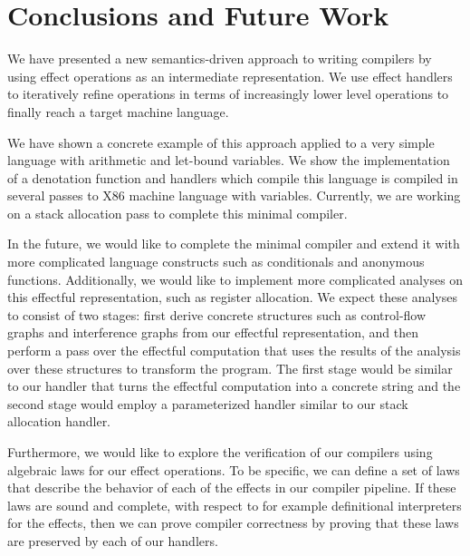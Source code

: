 \documentclass[a4paper,UKenglish,cleveref, autoref, thm-restate, anonymous]{oasics-v2021}
\begin{document}
\section{Conclusions and Future Work}\label{sec:conclusion}

We have presented a new semantics-driven approach to writing compilers by using effect operations as an intermediate representation.
We use effect handlers to iteratively refine operations in terms of increasingly lower level operations to finally reach a target machine language.

We have shown a concrete example of this approach applied to a very simple language with arithmetic and let-bound variables.
We show the implementation of a denotation function and handlers which compile this language is compiled in several passes to X86 machine language with variables.
Currently, we are working on a stack allocation pass to complete this minimal compiler.

In the future, we would like to complete the minimal compiler and extend it with more complicated language constructs such as conditionals and anonymous functions.
Additionally, we would like to implement more complicated analyses on this effectful representation, such as register allocation.
We expect these analyses to consist of two stages: first derive concrete structures such as control-flow graphs and interference graphs from our effectful representation, and then perform a pass over the effectful computation that uses the results of the analysis over these structures to transform the program.
The first stage would be similar to our handler that turns the effectful computation into a concrete string and the second stage would employ a parameterized handler similar to our stack allocation handler.

Furthermore, we would like to explore the verification of our compilers using algebraic laws for our effect operations.
To be specific, we can define a set of laws that describe the behavior of each of the effects in our compiler pipeline.
If these laws are sound and complete, with respect to for example definitional interpreters for the effects, then we can prove compiler correctness by proving that these laws are preserved by each of our handlers.




\end{document}
